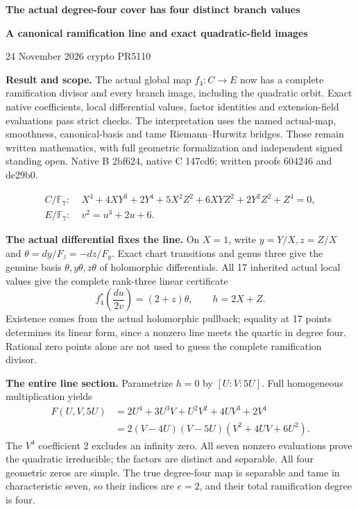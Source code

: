 \documentclass[10pt,a4paper]{article}
\begin{document}
{\Large\bfseries The actual degree-four cover has four distinct branch values}\par
{\large\bfseries A canonical ramification line and exact quadratic-field images}\par
24 November 2026 \quad crypto PR5110 

\textbf{Result and scope.} The actual global map $f_4:C\to E$ now has
a complete ramification divisor and every branch image, including the
quadratic orbit. Exact native coefficients, local differential values,
factor identities and extension-field evaluations pass strict checks.
The interpretation uses the named actual-map, smoothness, canonical-basis
and tame Riemann--Hurwitz bridges. Those remain written mathematics,
with full geometric formalization and independent signed standing open.
Native B 2bf624, native C 147cd6; written proofs 604246 and de29b0.

\[
\begin{split}
C/\mathbb F_7:\;&X^4+4XY^3+2Y^4+5X^2Z^2+6XYZ^2+2Y^2Z^2+Z^4=0,\\
E/\mathbb F_7:\;&v^2=u^3+2u+6.
\end{split}
\]

\textbf{The actual differential fixes the line.} On $X=1$, write
$y=Y/X,z=Z/X$ and $\theta=dy/F_z=-dz/F_y$. Exact chart transitions
and genus three give the genuine basis $\theta,y\theta,z\theta$ of
holomorphic differentials. All 17 inherited actual local values give
the complete rank-three linear certificate
\[
 f_4^*\!\left(\frac{du}{2v}\right)=(2+z)\theta,\qquad h=2X+Z.
\]
Existence comes from the actual holomorphic pullback; equality at 17
points determines its linear form, since a nonzero line meets the
quartic in degree four. Rational zero points alone are not used to
guess the complete ramification divisor.

\textbf{The entire line section.} Parametrize $h=0$ by $[U:V:5U]$.
Full homogeneous multiplication yields
\[
\begin{aligned}
F(U,V,5U)&=2U^4+3U^3V+U^2V^2+4UV^3+2V^4\\
 &=2(V-4U)(V-5U)(V^2+4UV+6U^2).
\end{aligned}
\]
The $V^4$ coefficient 2 excludes an infinity zero. All seven nonzero
evaluations prove the quadratic irreducible; the factors are distinct
and separable. All four geometric zeros are simple. The true degree-four
map is separable and tame in characteristic seven, so their indices
are $e=2$, and their total ramification degree is four.
\end{document}

